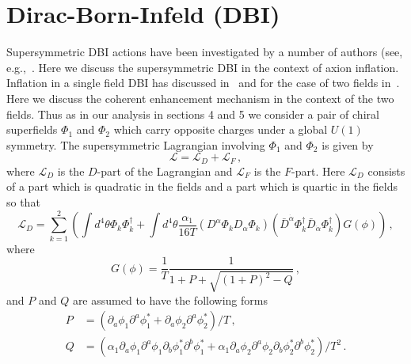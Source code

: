 \documentclass[11pt]{article}
\begin{document}
\section{Dirac-Born-Infeld (DBI) \label{sec:DBI}}
Supersymmetric DBI actions have been investigated by a number of authors (see, e.g.,~\cite{Nath:2018xxe, Khoury:2010gb, Khoury:2011da, Baumann:2011nk, Baumann:2011nm, Rocek:1997hi, Tseytlin:1999dj, Ito:2007hy, Billo:2008sp, Sasaki:2012ka, Aoki:2016tod}.
Here we discuss the supersymmetric DBI in the context of axion inflation.
Inflation in a single field DBI has discussed in~\cite{Sasaki:2012ka} and for the case of two fields in~\cite{Nath:2018xxe}.
Here we discuss the coherent enhancement mechanism in the context of the two fields.
Thus as in our analysis in sections 4 and 5 we consider a pair of chiral superfields $\Phi_1$ and $\Phi_2$ which carry opposite charges under a global $U\left(1\right)$ symmetry.
The supersymmetric Lagrangian involving $\Phi_1$ and $\Phi_2$ is given by
\begin{equation} \label{eq:DBI:lagrangianTerms}
  \mathcal{L} = \mathcal{L}_D + \mathcal{L}_F\,,
\end{equation}
where $\mathcal{L}_D$ is the $D$-part of the Lagrangian and $\mathcal{L}_F$ is the $F$-part.
Here $\mathcal{L}_D$ consists of a part which is quadratic in the fields and a part which is quartic in the fields so that
\begin{equation} \label{eq:DBI:lagrangianD}
  \mathcal{L}_D = \sum_{k = 1}^2 \left(\int d^4 \theta \Phi_k \Phi_k^\dagger
    + \int d^4 \theta \frac{\alpha_1}{16 T}
      \left(D^\alpha \Phi_k D_\alpha \Phi_k\right)
      \left({\bar D}^{\dot\alpha} \Phi_k^\dagger {\bar D}_{\dot\alpha} \Phi_k^\dagger\right)
      G\left(\phi\right)\right)\,,
\end{equation}
where
\begin{equation}
  G\left(\phi\right) = \frac{1}{T} \frac{1}{1 + P + \sqrt{\left(1 + P\right)^2 - Q}}\,,
\end{equation}
and $P$ and $Q$ are assumed to have the following forms
\begin{equation} \label{eq:DBI:PQ}
  \begin{aligned}
    P &= \left(
        \partial_a \phi_1 \partial^a \phi^*_1
      + \partial_a \phi_2 \partial^a \phi^*_2
    \right) / T\,,\\
    Q &= \left(
        \alpha_1 \partial_a \phi_1 \partial^a \phi_1 \partial_b \phi^*_1 \partial^b \phi^*_1
      + \alpha_1 \partial_a \phi_2 \partial^a \phi_2 \partial_b \phi^*_2 \partial^b \phi^*_2
    \right) / T^2\,.
  \end{aligned}
\end{equation}
\end{document}
